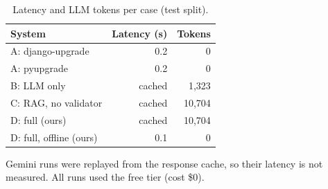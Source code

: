 \begin{table}[t]
\centering
\footnotesize
\setlength{\tabcolsep}{4pt}
\caption{Latency and LLM tokens per case (test split).}
\label{tab:cost-test}
\begin{tabular}{lrr}
\toprule
System & Latency (s) & Tokens \\
\midrule
A: django-upgrade & 0.2 & 0 \\
A: pyupgrade & 0.2 & 0 \\
B: LLM only & cached & 1,323 \\
C: RAG, no validator & cached & 10,704 \\
D: full (ours) & cached & 10,704 \\
D: full, offline (ours) & 0.1 & 0 \\
\bottomrule
\end{tabular}
\par\vspace{2pt}\parbox{\linewidth}{\scriptsize Gemini runs were replayed from the response cache, so their latency is not measured. All runs used the free tier (cost \$0).}
\end{table}
